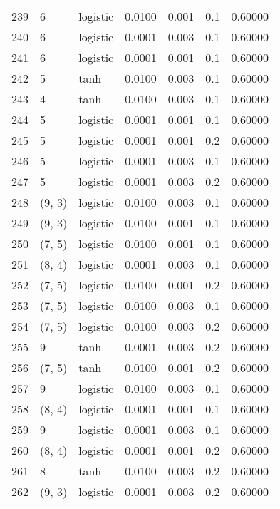 \begin{tabular}{lllrrrr}
239 &           6 &  logistic &  0.0100 &  0.001 &  0.1 &   0.60000 \\
240 &           6 &  logistic &  0.0001 &  0.003 &  0.1 &   0.60000 \\
241 &           6 &  logistic &  0.0001 &  0.001 &  0.1 &   0.60000 \\
242 &           5 &      tanh &  0.0100 &  0.003 &  0.1 &   0.60000 \\
243 &           4 &      tanh &  0.0100 &  0.003 &  0.1 &   0.60000 \\
244 &           5 &  logistic &  0.0001 &  0.001 &  0.1 &   0.60000 \\
245 &           5 &  logistic &  0.0001 &  0.001 &  0.2 &   0.60000 \\
246 &           5 &  logistic &  0.0001 &  0.003 &  0.1 &   0.60000 \\
247 &           5 &  logistic &  0.0001 &  0.003 &  0.2 &   0.60000 \\
248 &      (9, 3) &  logistic &  0.0100 &  0.003 &  0.1 &   0.60000 \\
249 &      (9, 3) &  logistic &  0.0100 &  0.001 &  0.1 &   0.60000 \\
250 &      (7, 5) &  logistic &  0.0100 &  0.001 &  0.1 &   0.60000 \\
251 &      (8, 4) &  logistic &  0.0001 &  0.003 &  0.1 &   0.60000 \\
252 &      (7, 5) &  logistic &  0.0100 &  0.001 &  0.2 &   0.60000 \\
253 &      (7, 5) &  logistic &  0.0100 &  0.003 &  0.1 &   0.60000 \\
254 &      (7, 5) &  logistic &  0.0100 &  0.003 &  0.2 &   0.60000 \\
255 &           9 &      tanh &  0.0001 &  0.003 &  0.2 &   0.60000 \\
256 &      (7, 5) &      tanh &  0.0100 &  0.001 &  0.2 &   0.60000 \\
257 &           9 &  logistic &  0.0100 &  0.003 &  0.1 &   0.60000 \\
258 &      (8, 4) &  logistic &  0.0001 &  0.001 &  0.1 &   0.60000 \\
259 &           9 &  logistic &  0.0001 &  0.003 &  0.1 &   0.60000 \\
260 &      (8, 4) &  logistic &  0.0001 &  0.001 &  0.2 &   0.60000 \\
261 &           8 &      tanh &  0.0100 &  0.003 &  0.2 &   0.60000 \\
262 &      (9, 3) &  logistic &  0.0001 &  0.003 &  0.2 &   0.60000 \\

\end{tabular}
